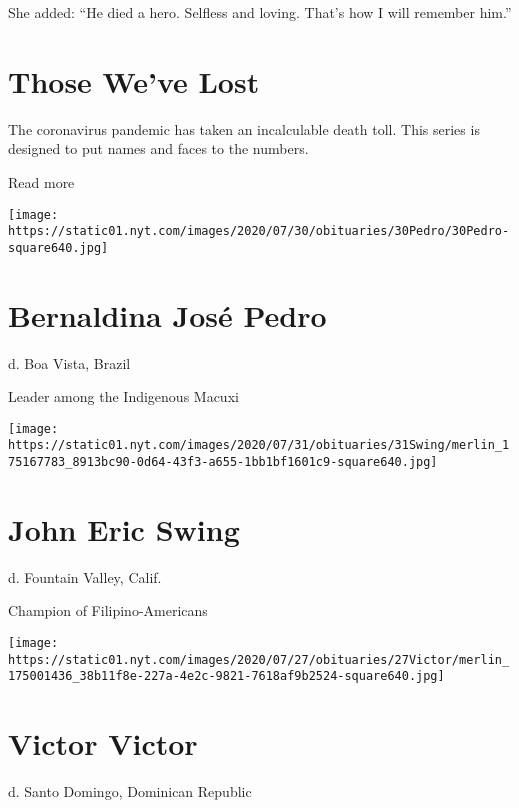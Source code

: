 She added: ``He died a hero. Selfless and loving. That's how I will
remember him.''

\href{https://www.nytimes.com/interactive/2020/obituaries/people-died-coronavirus-obituaries.html?action=click\&pgtype=Article\&state=default\&region=BELOW_MAIN_CONTENT\&context=covid_obits_promo}{}

\hypertarget{those-weve-lost}{%
\section{Those We've Lost}\label{those-weve-lost}}

The coronavirus pandemic has taken an incalculable death toll. This
series is designed to put names and faces to the numbers.

Read more

\texttt{[image: https://static01.nyt.com/images/2020/07/30/obituaries/30Pedro/30Pedro-square640.jpg]}

\hypertarget{bernaldina-josuxe9-pedro}{%
\section{Bernaldina José Pedro}\label{bernaldina-josuxe9-pedro}}

d. Boa Vista, Brazil

Leader among the Indigenous Macuxi

\texttt{[image: https://static01.nyt.com/images/2020/07/31/obituaries/31Swing/merlin\_175167783\_8913bc90-0d64-43f3-a655-1bb1bf1601c9-square640.jpg]}

\hypertarget{john-eric-swing}{%
\section{John Eric Swing}\label{john-eric-swing}}

d. Fountain Valley, Calif.

Champion of Filipino-Americans

\texttt{[image: https://static01.nyt.com/images/2020/07/27/obituaries/27Victor/merlin\_175001436\_38b11f8e-227a-4e2c-9821-7618af9b2524-square640.jpg]}

\hypertarget{victor-victor}{%
\section{Victor Victor}\label{victor-victor}}

d. Santo Domingo, Dominican Republic

